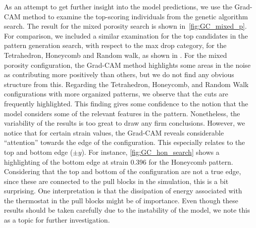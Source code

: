 As an attempt to get further insight into the model predictions, we use the Grad-CAM method to examine the top-scoring individuals from the genetic algorithm search. The result for the mixed porosity search is shown in~\cref{fig:GC_mixed_p}. For 
comparison, we included a similar examination for the top candidates in the
pattern generation search, with respect to the max drop category, for the
Tetrahedron, Honeycomb and Random walk, as shown in
. For the mixed porosity configuration, the Grad-CAM method highlights some areas in the noise 
as contributing more positively than others, but we do not find any obvious
structure from this. Regarding the Tetrahedron, Honeycomb, and Random Walk configurations with more organized patterns, we observe that the cuts are frequently highlighted. This finding gives some confidence to the notion that the model considers some of the relevant features in the pattern. Nonetheless, the variability of the results is too great to draw any firm conclusions. However, we notice that
for certain strain values, the Grad-CAM reveals considerable ``attention'' towards the edge of the configuration. This especially relates to the top and bottom edge ($\pm y$). For instance, \cref{fig:GC_hon_search} shows a highlighting of the bottom edge at strain 0.396 for the Honeycomb pattern. Considering that the top and bottom of the configuration are not a true edge, since these are connected to the pull blocks in the simulation, this is a bit surprising. One interpretation is that the dissipation of energy associated with the thermostat in the pull blocks might be of importance. Even though these results should be taken carefully due to the instability of the model, we note this as a topic for further investigation. 


